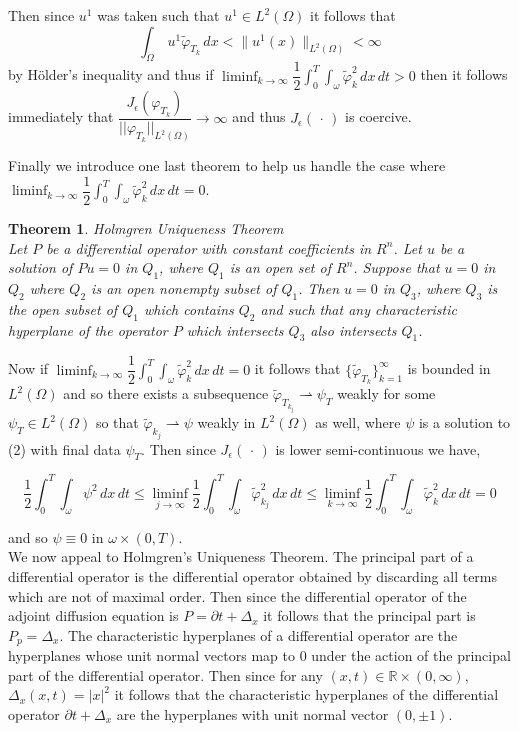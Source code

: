 \documentclass[11pt]{article}
\newtheorem{theorem}{Theorem}
\begin{document}
Then since $u^1$ was taken such that $u^1 \in L^2(\Omega)$ it follows that 
$$\int_\Omega\,u^1\widetilde{\varphi}_{T_k}\,dx < \lVert u^1(x)\rVert_{L^2(\Omega)} < \infty$$
by H{\"o}lder's inequality and thus if 
$\liminf_{k \to\infty} \dfrac{1}{2}\int_{0}^{T}\int_\omega\widetilde{\varphi}_k^2\,dx\,dt >0$ then it follows immediately that $\dfrac{J_\epsilon(\varphi_{T_k})}{\lvert\lvert\varphi_{T_k}\rvert\rvert_{L^2(\Omega)}} \rightarrow \infty$ and thus $J_\epsilon (\,\cdot\,)$ is coercive.


Finally we introduce one last theorem to help us handle the case where $\liminf_{k \to\infty} \dfrac{1}{2}\int_{0}^{T}\int_\omega\widetilde{\varphi}_k^2\,dx\,dt =0$.

\begin{theorem}{Holmgren Uniqueness Theorem}
\\Let $P$ be a differential operator with constant coefficients in $R^n$. Let $u$ be a solution of $Pu = 0$ in $Q_1$, where $Q_1$ is an open set of $R^n$. Suppose that $u = 0$ in $Q_2$ where $Q_2$ is an open nonempty subset of $Q_1$. Then $u = 0$ in $Q_3$, where $Q_3$ is the open subset of $Q_1$ which contains $Q_2$ and such that any characteristic hyperplane of the operator $P$ which intersects $Q_3$ also intersects $Q_1$.
\end{theorem}

Now if $\liminf_{k \to\infty} \dfrac{1}{2}\int_{0}^{T}\int_\omega\widetilde{\varphi}_k^2\,dx\,dt =0$ it follows that $\{\widetilde{\varphi}_{T_k}\}_{k=1}^{\infty}$ is bounded in $L^2(\Omega)$ and so there exists a subsequence $\widetilde{\varphi}_{T_{k_j}} \rightharpoonup \psi_T$ weakly for some $\psi_T \in L^2(\Omega)$ so that $\widetilde{\varphi}_{k_j} \rightharpoonup \psi$ weakly in $L^2(\Omega)$ as well, where $\psi$ is a solution to (2) with final data $\psi_T$. Then since $J_\epsilon(\,\cdot\,)$ is lower semi-continuous we have, 

$$\dfrac{1}{2}\int_{0}^{T}\int_\omega\psi^2\,dx\,dt \leq\liminf_{j \to\infty} \dfrac{1}{2}\int_{0}^{T}\int_\omega\widetilde{\varphi}_{k_j}^2\,dx\,dt \leq \liminf_{k \to\infty} \dfrac{1}{2}\int_{0}^{T}\int_\omega\widetilde{\varphi}_k^2\,dx\,dt =0$$

and so $\psi \equiv 0$ in $\omega \times (0,T)$. \\

We now appeal to Holmgren's Uniqueness Theorem. The principal part of a differential operator is the differential operator obtained by discarding all terms which are not of maximal order. Then since the differential operator of the adjoint diffusion equation is $P=\partial t + \Delta_x$ it follows that the principal part is $P_p=\Delta_x$. The characteristic hyperplanes of a differential operator are the hyperplanes whose unit normal vectors map to $0$ under the action of the principal part of the differential operator. Then since for any $(x,t) \in \mathbb{R} \times (0,\infty)$, $\Delta_x(x,t) = \lvert x\rvert ^2$ it follows that the characteristic hyperplanes of the differential operator $\partial t +\Delta_x$ are the hyperplanes with unit normal vector $(0,\pm 1)$. 
\end{document}
